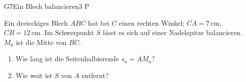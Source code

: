 \documentclass[11pt]{article}
\begin{document}
\begin{lpaufgabe}{G7}{Ein Blech balancieren}{3 P}
\begin{minipage}[t]{0.56\linewidth}\vspace{0pt}
Ein dreieckiges Blech $ABC$ hat bei $C$ einen rechten Winkel; $\overline{CA} = 7\,\text{cm}$, $\overline{CB} = 12\,\text{cm}$.
Im Schwerpunkt $S$ lässt es sich auf einer Nadelspitze balancieren. $M_a$ ist die Mitte von $\overline{BC}$.
\begin{enumerate}[label=(\alph*),leftmargin=*,itemsep=2pt]
\item Wie lang ist die Seitenhalbierende $s_a = \overline{AM_a}$?
\item Wie weit ist $S$ von $A$ entfernt?
\end{enumerate}
\end{minipage}\hfill
\begin{minipage}[t]{0.40\linewidth}\vspace{0pt}\centering
{}
\end{minipage}
\end{lpaufgabe}
\end{document}
